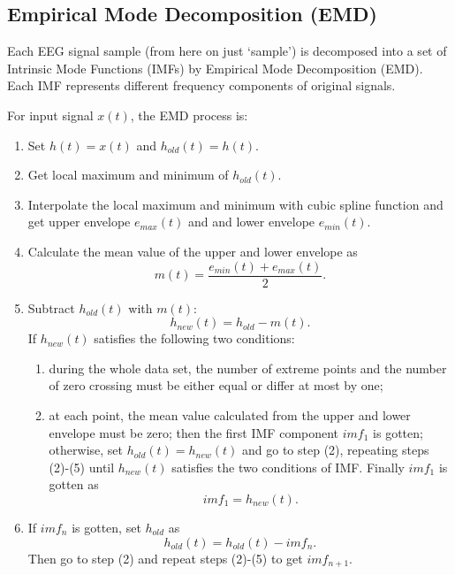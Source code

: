 \documentclass[10pt,journal,A4paper,compsoc,epsfig]{IEEEtran}
\begin{document}
\subsection{Empirical Mode Decomposition (EMD)}

Each EEG signal sample (from here on just `sample') is decomposed into a set of Intrinsic Mode Functions (IMFs) by Empirical Mode Decomposition (EMD). Each IMF represents different frequency components of original signals.

For input signal $x(t)$, the EMD process is:
\begin{enumerate}
\item Set $h(t) = x(t)$ and $h_{old}(t) = h(t)$.

\item Get local maximum and minimum of $h_{old}(t)$.

\item Interpolate the local maximum and minimum with cubic spline function and get upper envelope $e_{max}(t)$ and and lower envelope $e_{min}(t)$.

\item Calculate the mean value of the upper and lower envelope as
\begin{equation}
m(t) = \frac{e_{min}(t) + e_{max}(t)}{2}.
\end{equation}

\item Subtract $h_{old}(t)$ with $m(t)$:
\begin{equation}
h_{new}(t) = h_{old} - m(t).
\end{equation}
If $h_{new}(t)$ satisfies the following two conditions:
\begin{enumerate}
\item during the whole data set, the number of extreme points and the number of zero crossing must be either equal or differ at most by one;
\item at each point, the mean value calculated from the upper and lower envelope must be zero;
then the first IMF component $imf_1$ is gotten; otherwise, set $h_{old}(t) = h_{new}(t)$ and go to step (2), repeating steps (2)-(5) until $h_{new}(t)$ satisfies the two conditions of IMF.
Finally $imf_1$ is gotten as
\begin{equation}
imf_1 = h_{new}(t).
\end{equation}
\end{enumerate}

\item If $imf_n$ is gotten, set $h_{old}$ as
\begin{equation}
h_{old}(t) = h_{old}(t) - imf_n.
\end{equation}
Then go to step (2) and repeat steps (2)-(5) to get $imf_{n+1}$.
\end{enumerate}
\end{document}
